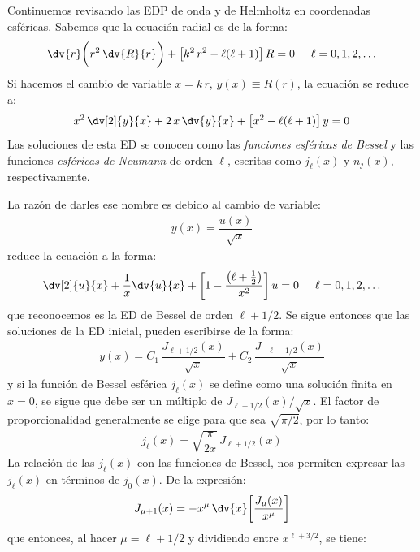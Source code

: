 Continuemos revisando las EDP de onda y de Helmholtz en coordenadas esféricas. Sabemos que la ecuación radial es de la forma:
\begin{align*}
\dv{r} \bigg( r^{2} \, \dv{R}{r} \bigg) + \big[ k^{2} \, r^{2} - \ell (\ell + 1) \big] \, R = 0 \hspace{0.5cm} \ell = 0, 1, 2, \ldots
\end{align*}
Si hacemos el cambio de variable $x = k \, r$, $y (x) \equiv R (r)$, la ecuación se reduce a:
\begin{align*}
x^{2} \, \dv[2]{y}{x} + 2 \, x \, \dv{y}{x} + \big[ x^{2} - \ell (\ell + 1) \big] \, y = 0
\end{align*}
Las soluciones de esta ED se conocen como las \emph{funciones esféricas de Bessel} y las funciones \emph{esféricas de Neumann} de orden $\ell$, escritas como $j_{\ell} (x)$ y $n_{j} (x)$, respectivamente.
\par
La razón de darles ese nombre es debido al cambio de variable:
\begin{align*}
y (x) = \dfrac{u (x)}{\sqrt{x}}
\end{align*}
reduce la ecuación a la forma:
\begin{align*}
\dv[2]{u}{x} + \dfrac{1}{x} \dv{u}{x} + \bigg[ 1 - \dfrac{\big( \ell + \frac{1}{2} \big)}{x^{2}} \bigg] \, u = 0 \hspace{0.5cm} \ell = 0, 1, 2, \ldots
\end{align*}
que reconocemos es la ED de Bessel de orden $\ell + 1/2$. Se sigue entonces que las soluciones de la ED inicial, pueden escribirse de la forma:
\begin{align*}
y (x) = C_{1} \, \dfrac{J_{\ell+1/2} (x)}{\sqrt{x}} + C_{2} \, \dfrac{J_{-\ell-1/2} (x)}{\sqrt{x}}
\end{align*}
y si la función de Bessel esférica $j_{\ell} (x)$ se define como una solución finita en $x = 0$, se sigue que debe ser un múltiplo de $J_{\ell+1/2} (x) / \sqrt{x}$. El factor de proporcionalidad generalmente se elige para que sea $\sqrt{\pi/2}$, por lo tanto:
\begin{align*}
j_{\ell} (x) = \sqrt{\dfrac{\pi}{2 x}} \, J_{\ell+1/2} (x)
\end{align*}
La relación de las $j_{\ell} (x)$ con las funciones de Bessel, nos permiten expresar las $j_{\ell} (x)$ en términos de $j_{0} (x)$. De la expresión:
\begin{align*}
J_{\mu+1} (x) = - x^{\mu} \, \dv{x} \bigg[ \dfrac{J_{\mu} (x)}{x^{\mu}} \bigg]
\end{align*}
que entonces, al hacer $\mu = \ell + 1/2$ y dividiendo entre $x^{\ell+3/2}$, se tiene:

